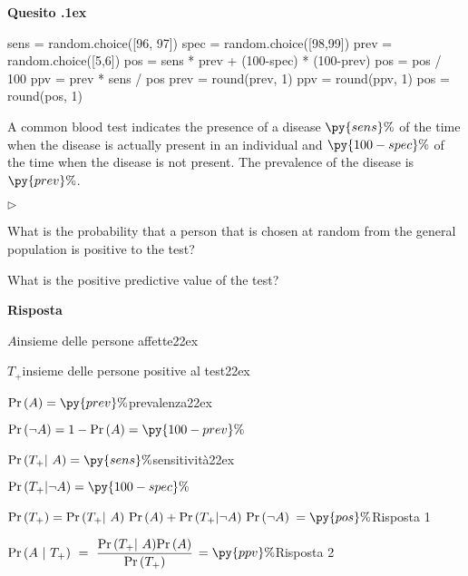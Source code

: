 \documentclass[11pt,twoside,a4paper]{article}
\newcommand{\mylabel}[1]{#1\hfill}
\renewenvironment{itemize}
  {\begin{list}{$\triangleright$}{%
   \setlength{\parskip}{0mm}
   \setlength{\topsep}{.4\baselineskip}
   \setlength{\rightmargin}{0mm}
   \setlength{\listparindent}{0mm}
   \setlength{\itemindent}{0mm}
   \setlength{\labelwidth}{2ex}
   \setlength{\itemsep}{.4\baselineskip}
   \setlength{\parsep}{0mm}
   \setlength{\partopsep}{0mm}
   \setlength{\labelsep}{1ex}
   \setlength{\leftmargin}{\labelwidth+\labelsep}
   \let\makelabel\mylabel}}{%
   \end{list}\vspace*{-1.3mm}}
\def\Pr{{\rm Pr\,}}
\newcounter{quesito}
\newenvironment{question}{\bigskip\addtocounter{quesito}{1}\par\textbf{Quesito \thequesito.\kern1ex}}{\vspace{\parskip}}
\newenvironment{answer}{\par\textbf{Risposta\quad}}{\vspace{\parskip}}
\begin{document}
\begin{question}
\def\Pr{{\rm Pr\,}}
\begin{pycode}
sens = random.choice([96, 97])
spec = random.choice([98,99])
prev = random.choice([5,6])
pos =  sens * prev + (100-spec) * (100-prev)
pos = pos / 100
ppv =  prev * sens  / pos
prev = round(prev, 1)
ppv = round(ppv, 1)
pos = round(pos, 1)
\end{pycode}
A common blood test indicates the presence of a disease $\py{sens}\%$ of the time when the disease is actually present in an individual and $\py{100-spec}\%$ of the time when the disease is not present. The prevalence of the disease is $\py{prev}\%$.
\begin{itemize}
\item[1.] What is the probability that a person that is chosen at random from the general population is positive to the test?
\item[2.] What is the positive predictive value of the test? 
\end{itemize}
\begin{answer}

$A$\hfill insieme delle persone affette\kern22ex

$T_+$\hfill insieme delle persone positive al test\kern22ex

$\Pr(A)=\py{prev}\%$\hfill prevalenza\kern22ex

$\Pr(\neg A)=1-\Pr(A)=\py{100-prev}\%$

$\Pr(T_+|~ A)=\py{sens}\%$\hfill sensitività\kern22ex

$\Pr(T_+|\neg A)=\py{100-spec}\%$

$\Pr(T_+)=\Pr(T_+|~A)\ \Pr(A) + \Pr(T_+|\neg A)\ \Pr(\neg A)$ {\color{blue} $=\py{pos}\%$\hfill Risposta 1}

$\displaystyle\Pr(A ~|~T_+)\ =\ \frac{\Pr(T_+|~A)\Pr(A)}{\Pr(T_+)}$ {\color{blue} $=\py{ppv}\%$\hfill Risposta 2}

\end{answer}
\end{question}
\end{document}

